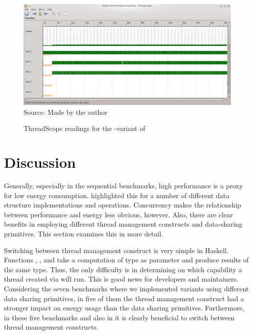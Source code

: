 \begin{figure}
\caption{ThreadScope readings for the \forkOS-\MVar variant of \fasta}
\centering
\includegraphics[width=\linewidth]{images/fasta-forkOS-MVar-20}
\footnotesize{Source: Made by the author}
\label{fig:threadscope2}
\end{figure}


\section{Discussion}\label{sec:discussion}
Generally, especially in the sequential benchmarks, high performance is a proxy for low energy consumption.  highlighted this for a number of different data structure implementations and operations. Concurrency makes the relationship between performance and energy less obvious, however. Also, there are clear benefits in employing  different thread management constructs and data-sharing primitives. This section examines this in more detail.

Switching between thread management construct is very simple in Haskell. Functions \forkOn, \forkIO, and \forkOS take a computation of type \IO as parameter and produce results of the same type. Thus, the only difficulty is in determining on which capability a thread created via \forkOn will run. This is good news for developers and maintainers. Considering the seven benchmarks where we implemented variants using different data sharing primitives, in five of them the thread management construct had a stronger impact on energy usage than the data sharing primitives. Furthermore, in these five benchmarks and also in \warp it is clearly beneficial to switch between thread management constructs.

